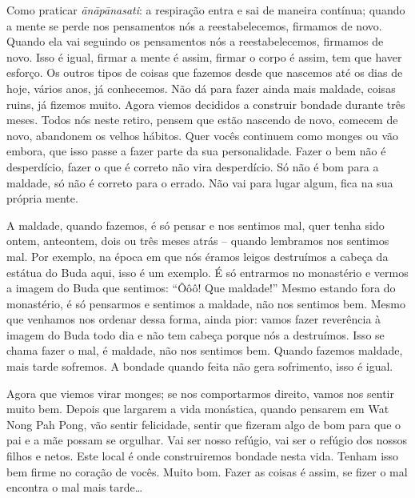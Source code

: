 Como praticar \textit{ānāpānasati}: a respiração entra e sai
de maneira contínua; quando a mente se perde nos pensamentos nós a
reestabelecemos, firmamos de novo. Quando ela vai seguindo os
pensamentos nós a reestabelecemos, firmamos de novo. Isso é igual,
firmar a mente é assim, firmar o corpo é assim, tem que haver esforço.
Os outros tipos de coisas que fazemos desde que nascemos até os dias de
hoje, vários anos, já conhecemos. Não dá para fazer ainda mais maldade,
coisas ruins, já fizemos muito. Agora viemos decididos a construir
bondade durante três meses. Todos nós neste retiro, pensem que estão
nascendo de novo, comecem de novo, abandonem os velhos hábitos. Quer
vocês continuem como monges ou vão embora, que isso passe a fazer parte
da sua personalidade. Fazer o bem não é desperdício, fazer o que é
correto não vira desperdício. Só não é bom para a maldade, só não é
correto para o errado. Não vai para lugar algum, fica na sua própria
mente. 

A maldade, quando fazemos, é só pensar e nos sentimos mal, quer
tenha sido ontem, anteontem, dois ou três meses atrás – quando
lembramos nos sentimos mal. Por exemplo, na época em que nós éramos
leigos destruímos a cabeça da estátua do Buda aqui, isso é um exemplo.
É só entrarmos no monastério e vermos a imagem do Buda que sentimos:
“Ôôô! Que maldade!” Mesmo estando fora do monastério, é só pensarmos e
sentimos a maldade, não nos sentimos bem. Mesmo que venhamos nos
ordenar dessa forma, ainda pior: vamos fazer reverência à imagem do
Buda todo dia e não tem cabeça porque nós a destruímos. Isso se chama
fazer o mal, é maldade, não nos sentimos bem. Quando fazemos maldade,
mais tarde sofremos. A bondade quando feita não gera sofrimento, isso é
igual.

Agora que viemos virar monges; se nos comportarmos direito, vamos
nos sentir muito bem. Depois que largarem a vida monástica, quando
pensarem em Wat Nong Pah Pong, vão sentir felicidade, sentir que
fizeram algo de bom para que o pai e a mãe possam se orgulhar. Vai ser
nosso refúgio, vai ser o refúgio dos nossos filhos e netos. Este local
é onde construiremos bondade nesta vida. Tenham isso bem firme no
coração de vocês. Muito bom. Fazer as coisas é assim, se fizer o mal
encontra o mal mais tarde…
